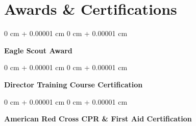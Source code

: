 \documentclass[10pt, letterpaper]{article}
\newenvironment{onecolentry}{
    \begin{adjustwidth}{
        0 cm + 0.00001 cm
    }{
        0 cm + 0.00001 cm
    }
}{
    \end{adjustwidth}
} %
\begin{document}
    
    {\color{secondaryColor}\section{Awards \& Certifications}}



        
        \begin{onecolentry}
            \textbf{Eagle Scout Award}
        \end{onecolentry}

        \vspace{0.2 cm}

        \begin{onecolentry}
            \textbf{Director Training Course Certification}
        \end{onecolentry}

        \vspace{0.2 cm}

        \begin{onecolentry}
            \textbf{American Red Cross CPR \& First Aid Certification}
        \end{onecolentry}
    
\end{document}

